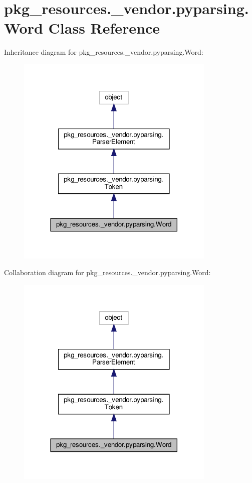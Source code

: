 \hypertarget{classpkg__resources_1_1__vendor_1_1pyparsing_1_1Word}{}\section{pkg\+\_\+resources.\+\_\+vendor.\+pyparsing.\+Word Class Reference}
\label{classpkg__resources_1_1__vendor_1_1pyparsing_1_1Word}


Inheritance diagram for pkg\+\_\+resources.\+\_\+vendor.\+pyparsing.\+Word\+:
\nopagebreak
\begin{figure}[H]
\begin{center}
\leavevmode
\includegraphics[width=269pt]{classpkg__resources_1_1__vendor_1_1pyparsing_1_1Word__inherit__graph}
\end{center}
\end{figure}


Collaboration diagram for pkg\+\_\+resources.\+\_\+vendor.\+pyparsing.\+Word\+:
\nopagebreak
\begin{figure}[H]
\begin{center}
\leavevmode
\includegraphics[width=269pt]{classpkg__resources_1_1__vendor_1_1pyparsing_1_1Word__coll__graph}
\end{center}
\end{figure}
